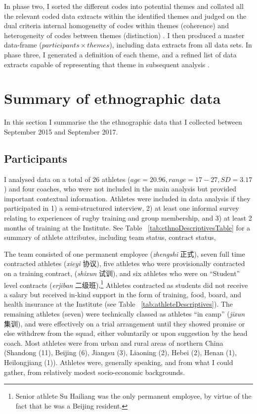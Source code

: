 \begin{CJK}{UTF8}{gbsn}
In phase two, I sorted the different codes into potential themes and collated all the relevant coded data extracts within the identified themes and judged on the dual criteria internal homogeneity of codes within themes (coherence) and heterogeneity of codes between themes (distinction) \citep{Patton1990}.  I then produced a master data-frame ($ participants \times themes$), including data extracts from all data sets. In phase three, I generated a definition of each theme, and a refined list of data extracts capable of representing that theme in subsequent analysis \citep{Braun2006}.


\section{Summary of ethnographic data}
In this section I summarise the the ethnographic data that I collected between September 2015 and September 2017.

\subsection{Participants}
I analysed data on a total of 26 athletes ($age = 20.96, range = 17-27, SD = 3.17$) and four coaches, who were not included in the main analysis but provided important contextual information.  Athletes were included in data analysis if they participated in 1) a semi-structured interview, 2) at least one informal survey relating to experiences of rugby training and group membership, and 3) at least 2 months of training at the Institute.  See Table ~\ref{tab:ethnoDescriptivesTable} for a summary of athlete attributes, including team status, contract status,



The team consisted of one permanent employee (\textit{zhengshi} 正式), seven full time contracted athletes (\textit{xieyi} 协议), five athletes who were provisionally contracted on a training contract, (\textit{shixun} 试训), and six athletes who were on ``Student'' level contracts (\textit{erjiban} 二级班).\footnote{Senior athlete Su Hailiang was the only permanent employee, by virtue of the fact that he was a Beijing resident.}  Athletes contracted as students did not receive a salary but received in-kind support in the form of training, food, board, and health insurance at the Institute (see Table ~\ref{tab:athleteDescriptives}).  The remaining athletes (seven) were technically classed as athletes ``in camp'' (\textit{jixun} 集训), and were effectively on a trial arrangement until they showed promise or else withdrew from the squad, either voluntarily or upon suggestion by the head coach.  Most athletes were from urban and rural areas of northern China (Shandong (11), Beijing (6), Jiangsu (3), Liaoning (2), Hebei (2), Henan (1), Heilongjiang (1)). Athletes were, generally speaking, and from what I could gather, from relatively modest socio-economic backgrounds.


\end{CJK}

